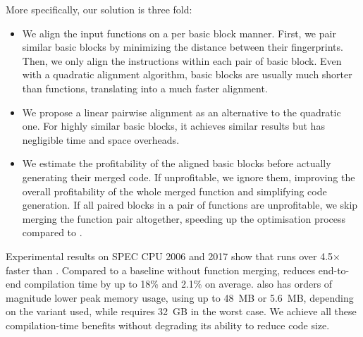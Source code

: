 More specifically, our solution is three fold:
\begin{itemize} %
   \item We align the input functions on a per basic block manner.
   First, we pair similar basic blocks by minimizing the distance between their fingerprints.
   Then, we only align the instructions within each pair of basic block.  
   Even with a quadratic alignment algorithm, basic blocks are usually much shorter than functions, translating into a much faster alignment.
   \item We propose a linear pairwise alignment as an alternative to the quadratic one. For highly similar basic blocks, it achieves similar results but has negligible time and space overheads.
   \item We estimate the profitability of the aligned basic blocks before actually generating their merged code.
   If unprofitable, we ignore them, improving the overall profitability of the whole merged function and simplifying code generation.
   If all paired blocks in a pair of functions are unprofitable, we skip merging the function pair altogether, speeding up the optimisation process compared to {\SOAName}. 
\end{itemize}

Experimental results on SPEC CPU 2006 and 2017 show that {\ProjName} runs over 4.5$\times$ faster than {\SOAName}.
Compared to a baseline without function merging, {\ProjName} reduces end-to-end compilation time by up to 18\% and 2.1\% on average.
{\ProjName} also has orders of magnitude lower peak memory usage, using up to 48~MB or 5.6~MB, depending on the variant used, while {\SOAName} requires 32~GB in the worst case.
We achieve all these compilation-time benefits without degrading its ability to reduce code size.







